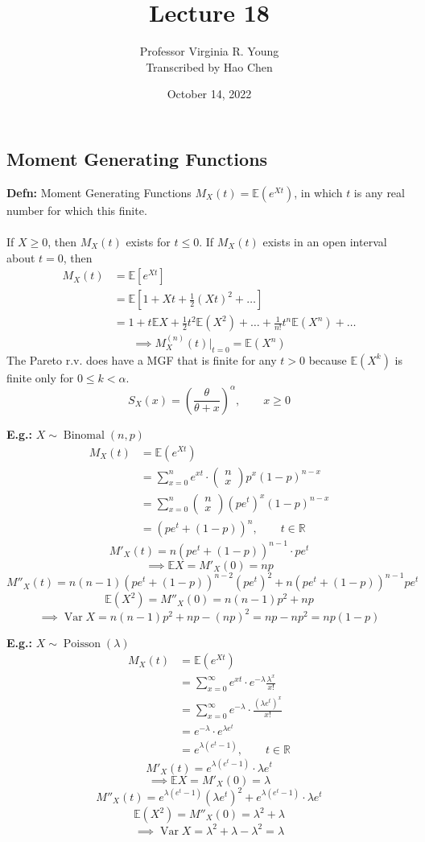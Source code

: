 \documentclass[a4paper]{article}
\title{Lecture 18}
\author{Professor Virginia R. Young\\ \small{Transcribed by Hao Chen}}
\date{October 14, 2022}
\newcommand{\n}{\hfill\break}
\newcommand{\defn}[1]{\par\noindent\settowidth{\hangindent}{\textbf{Defn: }}\textbf{Defn: }#1\n}
\newcommand{\eg}[1]{\par\noindent\settowidth{\hangindent}{\textbf{E.g.: }}\textbf{E.g.: }#1\n}
\newcommand{\reals}{\mathbb{R}}
\newcommand{\R}{\reals}
\newcommand{\Avg}{\mathbb{E}}
\newcommand{\E}{\Avg}
\DeclareMathOperator{\Var}{Var}
\DeclareMathOperator{\Bin}{Binomal}
\DeclareMathOperator{\Poisson}{Poisson}
\begin{document}
\maketitle

\subsection*{Moment Generating Functions}

\defn{
    Moment Generating Functions $M_X(t)=\E(e^{Xt})$, in which $t$ is any real number for which this finite. 
    \\\\
    If $X\geq 0$, then $M_X(t)$ exists for $t\leq 0$. If $M_X(t)$ exists in an open interval about $t=0$, then
    \begin{align*}
        M_X(t)&=\E[e^{Xt}] \\
        &=\E[1+Xt+\frac{1}{2}(Xt)^2+\dots] \\
        &=1+t\E X+\frac{1}{2}t^2\E(X^2)+\dots+\frac{1}{n!}t^n\E(X^n)+\dots
    \end{align*}
    \[\implies M^{(n)}_X(t)\bigg\vert_{t=0}=\E(X^n)\]
    The Pareto r.v. does have a MGF that is finite for any $t>0$ because $\E(X^k)$ is finite only for $0\leq k<\alpha$.
    \[S_X(x)=\left(\frac{\theta}{\theta+x}\right)^\alpha, \qquad x\geq0\]
}

\eg{
    $X\sim\Bin(n,p)$
    \begin{align*}
        M_X(t)&=\E(e^{Xt}) \\
        &=\sum^n_{x=0}e^{xt}\cdot\begin{pmatrix}n\\x\end{pmatrix}p^x(1-p)^{n-x} \\
        &=\sum^n_{x=0}\begin{pmatrix}n\\x\end{pmatrix}(pe^t)^x(1-p)^{n-x} \\
        &=(pe^t+(1-p))^n, \qquad t\in\R
    \end{align*}
    \[M'_X(t)=n(pe^t+(1-p))^{n-1}\cdot pe^t\]
    \[\implies\E X=M'_X(0)=np\]
    \[M''_X(t)=n(n-1)(pe^t+(1-p))^{n-2}(pe^t)^2+n(pe^t+(1-p))^{n-1}pe^t\]
    \[\E(X^2)=M''_X(0)=n(n-1)p^2+np\]
    \[\implies\Var X=n(n-1)p^2+np-(np)^2=np-np^2=np(1-p)\]
}

\eg{
    $X\sim\Poisson(\lambda)$
    \begin{align*}
        M_X(t)&=\E(e^{Xt}) \\
        &=\sum^\infty_{x=0}e^{xt}\cdot e^{-\lambda}\frac{\lambda^x}{x!} \\
        &=\sum^\infty_{x=0}e^{-\lambda}\cdot\frac{(\lambda e^t)^x}{x!} \\
        &=e^{-\lambda}\cdot e^{\lambda e^t} \\
        &=e^{\lambda(e^t-1)}, \qquad t\in\R
    \end{align*}
    \[M'_X(t)=e^{\lambda(e^t-1)}\cdot\lambda e^t\]
    \[\implies\E X=M'_X(0)=\lambda\]
    \[M''_X(t)=e^{\lambda(e^t-1)}(\lambda e^t)^2+e^{\lambda(e^t-1)}\cdot\lambda e^t\]
    \[\E(X^2)=M''_X(0)=\lambda^2+\lambda\]
    \[\implies\Var X=\lambda^2+\lambda-\lambda^2=\lambda\]
}
\end{document}
